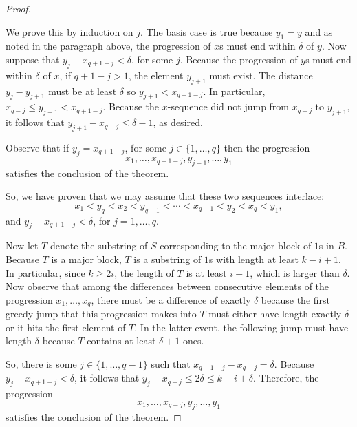 \begin{proof}
\begin{claim}
We prove this by induction on $j$. The basis case is true because $y_1=y$ and as noted in the paragraph above, the progression of $x$s must end within $\delta$ of $y$. Now suppose that $y_{j} - x_{q+1-j} < \delta$, for some $j$. Because the progression of $y$s must end within $\delta$ of $x$, if $q+1-j > 1$, the element $y_{j+1}$ must exist. The distance $y_{j} - y_{j+1}$ must be at least $\delta$ so $y_{j+1} < x_{q+1-j}$. In particular, $x_{q-j} \leq y_{j+1} < x_{q+1-j}$. Because the $x$-sequence did not jump from $x_{q-j}$ to $ y_{j+1}$, it follows that $y_{j+1}- x_{q-j} \leq \delta - 1$, as desired.
\end{claim}
Observe that if $y_j = x_{q+1-j}$, for some $j \in \{1,\ldots,q\}$ then the progression \[ x_1, \dotsc, x_{q+1-j}, y_{j-1}, \dotsc, y_1 \] satisfies the conclusion of the theorem.

So, we have proven that we may assume that these two sequences interlace: \[ x_1 < y_q < x_2 < y_{q-1} < \dotsb < x_{q-1} < y_2 < x_{q} < y_1,\] and $y_j - x_{q+1-j} < \delta$, for $j=1, \dotsc, q$.
 
Now let $T$ denote the substring of $S$ corresponding to the major block of $1$s in $B$. Because $T$ is a major block, $T$ is a substring of $1$s with length at least $k-i+1$. In particular, since $k \geq 2i$, the length of $T$ is at least $i+1$, which is larger than $\delta$. Now observe that among the differences between consecutive elements of the progression $x_1,\ldots,x_q$, there must be a difference of exactly $\delta$ because the first greedy jump that this progression makes into $T$ must either have length exactly $\delta$ or it hits the first element of $T$. In the latter event, the following jump must have length $\delta$ because $T$ contains at least $\delta + 1$ ones.

So, there is some $j \in \{1,\ldots,q-1\}$ such that $x_{q+1-j} - x_{q-j} = \delta$. Because $y_j - x_{q+1-j} < \delta$, it follows that $y_j - x_{q-j} \leq 2\delta \leq k - i + \delta$. Therefore, the progression \[ x_1,\dotsc, x_{q-j}, y_{j}, \dotsc, y_1 \] satisfies the conclusion of the theorem.
\end{proof}

